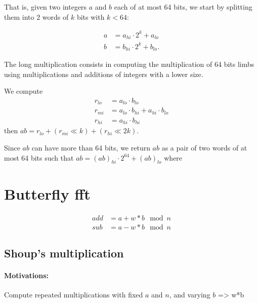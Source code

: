 \documentclass[a4paper]{article}
\begin{document}
That is, given two integers $a$ and $b$ each of at most 64 bits, we start by splitting them into 2 words of $k$ bits with $k<64$:

\begin{align*}
    a &= a_{hi}\cdot 2^{k} + a_{lo} \\
    b &= b_{hi}\cdot 2^{k} + b_{lo}.
\end{align*}

The long multiplication consists in computing the multiplication of 64 bits limbs using multiplications and additions of integers with a lower size.

We compute
\begin{align*}
    r_{lo} &= a_{lo}\cdot b_{lo} \\
    r_{mi} &= a_{lo}\cdot b_{hi} + a_{hi}\cdot b_{lo} \\
    r_{hi} &= a_{hi}\cdot b_{hi}
\end{align*}
then $ab = r_{lo} + (r_{mi} \ll k) + (r_{hi} \ll 2k)$.

Since $ab$ can have more than 64 bits, we return $ab$ as a pair of two words of at most 64 bits such that $ab = (ab)_{hi}\cdot 2^{64} + (ab)_{lo}$ where



\newpage
\section{Butterfly fft}
\begin{align*}
    add &= a + w*b \mod n \\
    sub &= a - w*b \mod n 
\end{align*}

\subsection{Shoup's multiplication}


\paragraph{Motivations:} Compute repeated multiplications with fixed $a$ and $n$, and varying $b$ => w*b
\end{document}

